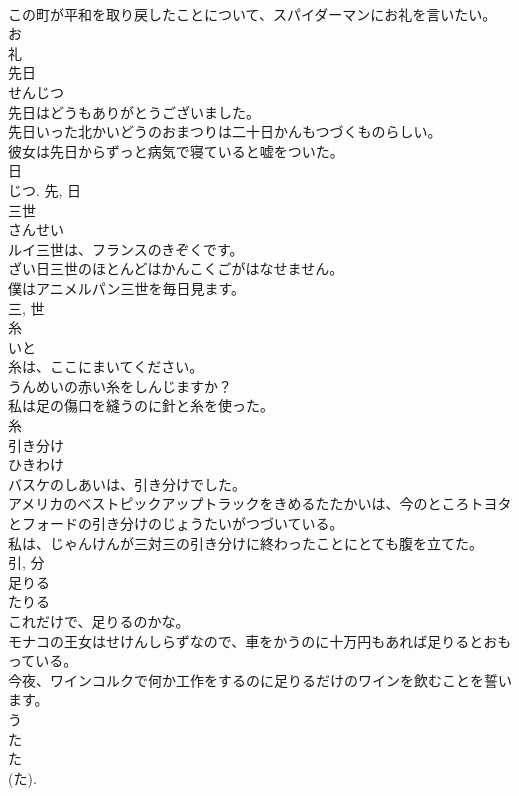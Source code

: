 \documentclass[8pt]{extreport}
\begin{document}
\begin{CJK}{UTF8}{min}
\\	この町が平和を取り戻したことについて、スパイダーマンにお礼を言いたい。	
\\	お 
\\	礼	
\\	先日	
\\	せんじつ	
\\	先日はどうもありがとうございました。	
\\	先日いった北かいどうのおまつりは二十日かんもつづくものらしい。	
\\	彼女は先日からずっと病気で寝ていると嘘をついた。	
\\	日 
\\	じつ.	先, 日	
\\	三世	
\\	さんせい	
\\	ルイ三世は、フランスのきぞくです。	
\\	ざい日三世のほとんどはかんこくごがはなせません。	
\\	僕はアニメルパン三世を毎日見ます。	
\\	三, 世	
\\	糸	
\\	いと	
\\	糸は、ここにまいてください。	
\\	うんめいの赤い糸をしんじますか？	
\\	私は足の傷口を縫うのに針と糸を使った。	
\\	糸	
\\	引き分け	
\\	ひきわけ	
\\	バスケのしあいは、引き分けでした。	
\\	アメリカのベストピックアップトラックをきめるたたかいは、今のところトヨタとフォードの引き分けのじょうたいがつづいている。	
\\	私は、じゃんけんが三対三の引き分けに終わったことにとても腹を立てた。	
\\	引, 分	
\\	足りる	
\\	たりる	
\\	これだけで、足りるのかな。	
\\	モナコの王女はせけんしらずなので、車をかうのに十万円もあれば足りるとおもっている。	
\\	今夜、ワインコルクで何か工作をするのに足りるだけのワインを飲むことを誓います。	
\\	う 
\\	た 
\\	た 
\\	(た). 

\end{CJK}
\end{document}
